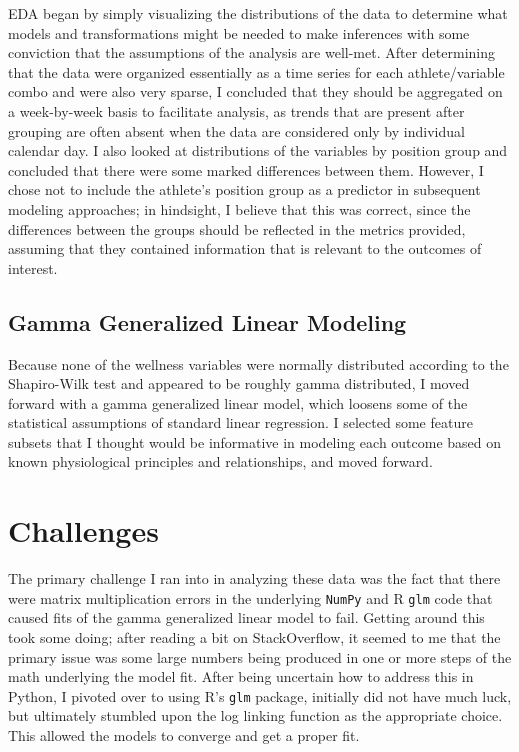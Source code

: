 \documentclass{article}
\begin{document}
			EDA began by simply visualizing the
			distributions of the data to determine what models and transformations
			might be needed to make inferences with some
			conviction that the assumptions of the analysis are well-met. After
			determining that the data were organized essentially as a time series
			for each athlete/variable combo and were also very sparse, I concluded
			that they should be aggregated on a week-by-week basis to facilitate
			analysis, as trends that are present after grouping are often absent
			when the data are considered only by individual calendar day.
			I also looked at distributions of the variables by position group and
			concluded that there were some marked differences between them.
			However, I chose not to include the athlete's position group
			as a predictor in subsequent modeling approaches; in hindsight, I believe
			that this was correct, since the differences
			between the groups should be reflected in the metrics provided, assuming
			that they contained information that is relevant to the outcomes of
			interest.

		\subsection{Gamma Generalized Linear Modeling}

			Because none of the wellness variables were normally distributed according
			to the Shapiro-Wilk test and appeared to be roughly gamma distributed,
			I moved forward with a gamma generalized linear model,
			which loosens some of the statistical assumptions of standard linear
			regression. I selected some feature subsets that I thought would be
			informative in modeling each outcome based on known physiological
			principles and relationships, and moved forward.

	\section{Challenges}

		The primary challenge I ran into in analyzing these data was the fact that
		there were matrix multiplication errors in the underlying \texttt{NumPy}
		and R \texttt{glm} code that caused fits of the gamma generalized linear model
		to fail. Getting around this took some doing; after reading a bit on
		StackOverflow, it seemed to me that the primary issue was some large numbers
		being produced in one or more steps of the math underlying the model fit.
		After being uncertain how to address this in Python, I pivoted over to using
		R's \texttt{glm} package, initially did not have much luck, but ultimately
		stumbled upon the log linking function as the appropriate choice. This
		allowed the models to converge and get a proper fit.
\end{document}
